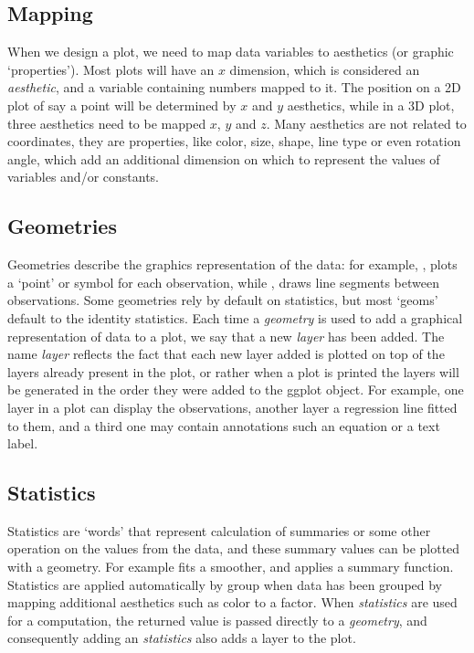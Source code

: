\documentclass[krantz2]{krantz}\usepackage{knitr}%
\begin{document}
\subsection{Mapping}

When we design a plot, we need to map data variables to aesthetics (or graphic `properties'). Most plots will have an $x$ dimension, which is considered an \emph{aesthetic}, and a variable containing numbers mapped to it. The position on a 2D plot of say a point will be determined by $x$ and $y$ aesthetics, while in a 3D plot, three aesthetics need to be mapped $x$, $y$ and $z$. Many aesthetics are not related to coordinates, they are properties, like color, size, shape, line type or even rotation angle, which add an additional dimension on which to represent the values of variables and/or constants.

\subsection{Geometries}

\sloppy%
Geometries describe the graphics representation of the data: for example, , plots a `point' or symbol for each observation, while , draws line segments between observations. Some geometries rely by default on statistics, but most `geoms' default to the identity statistics. Each time a \emph{geometry} is used to add a graphical representation of data to a plot, we say that a new \emph{layer} has been added. The name \emph{layer} reflects the fact that each new layer added is plotted on top of the layers already present in the plot, or rather when a plot is printed the layers will be generated in the order they were added to the ggplot object. For example, one layer in a plot can display the observations, another layer a regression line fitted to them, and a third one may contain annotations such an equation or a text label.

\subsection{Statistics}

Statistics are `words' that represent calculation of summaries or some other operation on the values from the data, and these summary values can be plotted with a geometry. For example  fits a smoother, and  applies a summary function. Statistics are applied automatically by group when data has been grouped by mapping additional aesthetics such as color to a factor. When \emph{statistics} are used for a computation, the returned value is passed directly to a \emph{geometry}, and consequently adding an \emph{statistics} also adds a layer to the plot.
\end{document}
